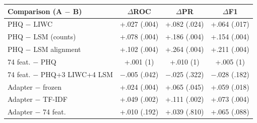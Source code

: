 \begin{tabular}{lccc}
\toprule
Comparison (A $-$ B) & $\Delta$ROC & $\Delta$PR & $\Delta$F1 \\
\midrule
PHQ $-$ LIWC & +.027 (.004) & +.082 (.024) & +.064 (.017) \\
PHQ $-$ LSM (counts) & +.078 (.004) & +.186 (.004) & +.154 (.004) \\
PHQ $-$ LSM alignment & +.102 (.004) & +.264 (.004) & +.211 (.004) \\
74 feat. $-$ PHQ & +.001 (1) & +.010 (1) & +.005 (1) \\
74 feat. $-$ PHQ+3 LIWC+4 LSM & $-$.005 (.042) & $-$.025 (.322) & $-$.028 (.182) \\
Adapter $-$ frozen & +.024 (.004) & +.065 (.045) & +.059 (.018) \\
Adapter $-$ TF-IDF & +.049 (.002) & +.111 (.002) & +.073 (.004) \\
Adapter $-$ 74 feat. & +.010 (.192) & +.039 (.810) & +.065 (.088) \\
\bottomrule
\end{tabular}
